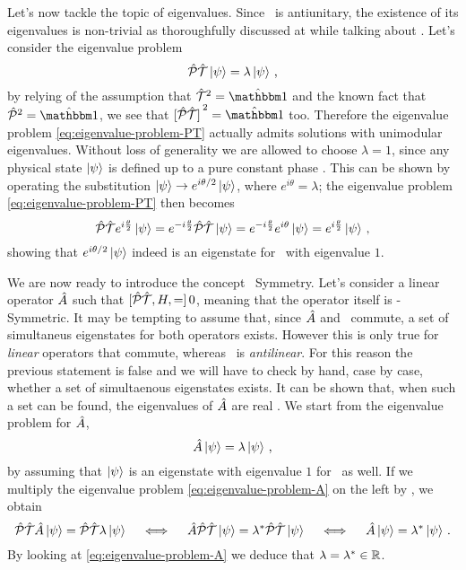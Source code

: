         Let's now tackle the topic of eigenvalues. Since \hPT\ is antiunitary, the existence of its eigenvalues is non-trivial as thoroughfully discussed at  while talking about \hT. Let's consider the eigenvalue problem
        \begin{equation}
            \label{eq:eigenvalue-problem-PT}
            \mathcal{\hat{P}}\mathcal{\hat{T}} \ket{\psi} = \lambda \ket{\psi}
            \,\text{,}
        \end{equation}
        by relying of the assumption that $\hT^2 = \togglehat{\idM}$ and the known fact that $\hP^2 = \togglehat{\idM}$, we see that $\bqty*{\hPT}^2 = \togglehat{\idM}$ too. Therefore the eigenvalue problem \eqref{eq:eigenvalue-problem-PT} actually admits solutions with unimodular eigenvalues. Without loss of generality we are allowed to choose $\lambda = 1$, since any physical state $\ket{\psi}$ is defined up to a pure constant phase \cite{Bender2005}. This can be shown by operating the substitution $\ket{\psi} \rightarrow e^{i\theta / 2}\ket{\psi}$, where $e^{i\theta} = \lambda$; the eigenvalue problem \eqref{eq:eigenvalue-problem-PT} then becomes
        \begin{equation*}
            \mathcal{\hat{P}}\mathcal{\hat{T}} e^{i\frac{\theta}{2}} \ket{\psi} = e^{-i\frac{\theta}{2}} \mathcal{\hat{P}}\mathcal{\hat{T}} \ket{\psi} = e^{-i\frac{\theta}{2}} e^{i\theta} \ket{\psi} = e^{i\frac{\theta}{2}} \ket{\psi}
            \,\text{,}
        \end{equation*}
        showing that $e^{i\theta / 2}\ket{\psi}$ indeed is an eigenstate for \hPT\ with eigenvalue $1$.

        We are now ready to introduce the concept \PT\ Symmetry. Let's consider a linear operator $\hat{A}$ such that $\comm*{\hPT, H} = 0$, meaning that the operator itself is \PT-Symmetric. It may be tempting to assume that, since $\hat{A}$ and \hPT\ commute, a set of simultaneus eigenstates for both operators exists. However this is only true for \emph{linear} operators that commute, whereas \hPT\ is \emph{antilinear}. For this reason the previous statement is false \cite{bender2024} and we will have to check by hand, case by case, whether a set of simultaenous eigenstates exists. It can be shown that, when such a set can be found, the eigenvalues of $\hat{A}$ are real \cite{bender2024}. We start from the eigenvalue problem for $\hat{A}$,
        \begin{equation}
            \label{eq:eigenvalue-problem-A}
            \hat{A} \ket{\psi} = \lambda \ket{\psi}
            \,\text{,}
        \end{equation}
        by assuming that $\ket{\psi}$ is an eigenstate with eigenvalue $1$ for \hPT\ as well. If we multiply the eigenvalue problem \eqref{eq:eigenvalue-problem-A} on the left by \hPT, we obtain
        \begin{equation*}
            \mathcal{\hat{P}}\mathcal{\hat{T}} \hat{A} \ket{\psi} = \mathcal{\hat{P}}\mathcal{\hat{T}} \lambda \ket{\psi}
            \quad\iff\quad
            \hat{A} \mathcal{\hat{P}}\mathcal{\hat{T}} \ket{\psi} = \lambda^* \mathcal{\hat{P}}\mathcal{\hat{T}} \ket{\psi}
            \quad\iff\quad
            \hat{A} \ket{\psi} = \lambda^* \ket{\psi}
            \,\text{.}
        \end{equation*}
        By looking at \eqref{eq:eigenvalue-problem-A} we deduce that $\lambda = \lambda^* \in \mathbb{R}$.

